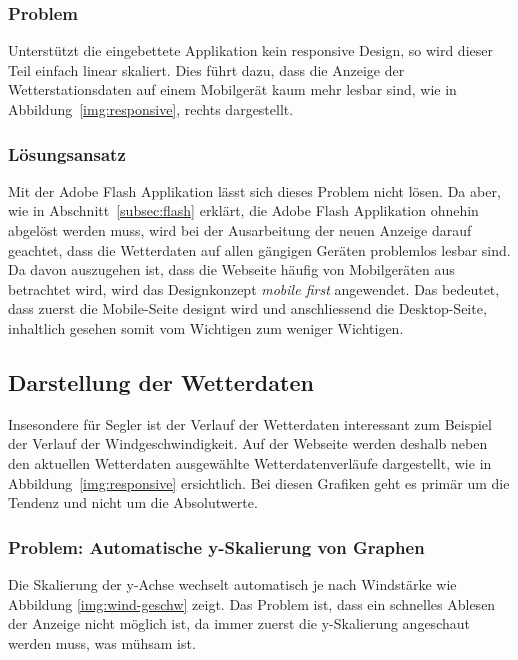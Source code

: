 \subsubsection*{Problem}
Unterstützt die eingebettete Applikation kein responsive Design, so wird dieser Teil einfach linear skaliert. Dies führt dazu, dass die Anzeige der Wetterstationsdaten auf einem Mobilgerät kaum mehr lesbar sind, wie in Abbildung~\ref{img:responsive}, rechts dargestellt.


\subsubsection*{Lösungsansatz}
Mit der Adobe Flash Applikation lässt sich dieses Problem nicht lösen. Da aber, wie in Abschnitt~\ref{subsec:flash} erklärt, die Adobe Flash Applikation ohnehin abgelöst werden muss, wird bei der Ausarbeitung der neuen Anzeige darauf geachtet, dass die Wetterdaten auf allen gängigen Geräten problemlos lesbar sind. Da davon auszugehen ist, dass die Webseite häufig von Mobilgeräten aus betrachtet wird, wird das Designkonzept \textit{mobile first} angewendet. Das bedeutet, dass zuerst die Mobile-Seite designt wird und anschliessend die Desktop-Seite, inhaltlich gesehen somit vom Wichtigen zum weniger Wichtigen. 



\subsection{Darstellung der Wetterdaten}
Insesondere für Segler ist der Verlauf der Wetterdaten interessant zum Beispiel der Verlauf der Windgeschwindigkeit. Auf der Webseite werden deshalb neben den aktuellen Wetterdaten ausgewählte Wetterdatenverläufe dargestellt, wie in Abbildung~\ref{img:responsive} ersichtlich. Bei diesen Grafiken geht es primär um die Tendenz und nicht um die Absolutwerte.

\subsubsection*{Problem: Automatische y-Skalierung von Graphen}
Die Skalierung der y-Achse wechselt automatisch je nach Windstärke wie Abbildung \ref{img:wind-geschw} zeigt. Das Problem ist, dass ein schnelles Ablesen der Anzeige nicht möglich ist, da immer zuerst die y-Skalierung angeschaut werden muss, was mühsam ist.

